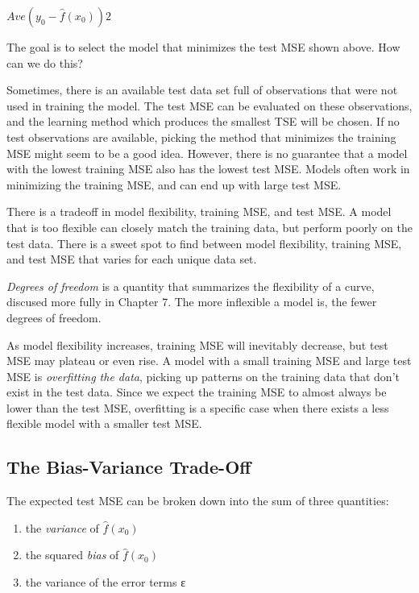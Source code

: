 \documentclass[]{book}
\providecommand{\tightlist}{%
  \setlength{\itemsep}{0pt}\setlength{\parskip}{0pt}}
\begin{document}
\(Ave(y_0 - \hat{f}(x_0))2\)

The goal is to select the model that minimizes the test MSE shown above. How can we do this?

Sometimes, there is an available test data set full of observations that were not used in training the model. The test MSE can be evaluated on these observations, and the learning method which produces the smallest TSE will be chosen. If no test observations are available, picking the method that minimizes the training MSE might seem to be a good idea. However, there is no guarantee that a model with the lowest training MSE also has the lowest test MSE. Models often work in minimizing the training MSE, and can end up with large test MSE.

There is a tradeoff in model flexibility, training MSE, and test MSE. A model that is too flexible can closely match the training data, but perform poorly on the test data. There is a sweet spot to find between model flexibility, training MSE, and test MSE that varies for each unique data set.

\emph{Degrees of freedom} is a quantity that summarizes the flexibility of a curve, discused more fully in Chapter 7. The more inflexible a model is, the fewer degrees of freedom.

As model flexibility increases, training MSE will inevitably decrease, but test MSE may plateau or even rise. A model with a small training MSE and large test MSE is \emph{overfitting the data}, picking up patterns on the training data that don't exist in the test data. Since we expect the training MSE to almost always be lower than the test MSE, overfitting is a specific case when there exists a less flexible model with a smaller test MSE.

\hypertarget{the-bias-variance-trade-off}{%
\subsection{The Bias-Variance Trade-Off}\label{the-bias-variance-trade-off}}

The expected test MSE can be broken down into the sum of three quantities:

\begin{enumerate}
\def\labelenumi{\arabic{enumi}.}
\tightlist
\item
  the \emph{variance} of \(\hat{f}(x_0)\)
\item
  the squared \emph{bias} of \(\hat{f}(x_0)\)
\item
  the variance of the error terms ε
\end{enumerate}
\end{document}
